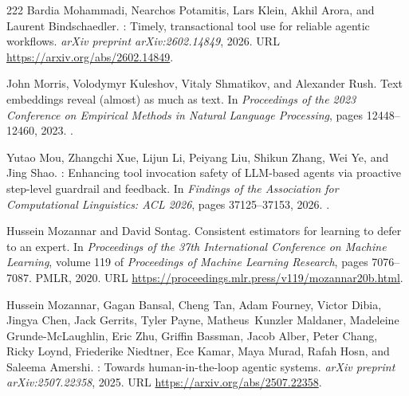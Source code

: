 \begin{thebibliography}{222}
Bardia Mohammadi, Nearchos Potamitis, Lars Klein, Akhil Arora, and Laurent
  Bindschaedler.
: Timely, transactional tool use for reliable agentic
  workflows.
\newblock \emph{arXiv preprint arXiv:2602.14849}, 2026.
\newblock URL \url{https://arxiv.org/abs/2602.14849}.

John Morris, Volodymyr Kuleshov, Vitaly Shmatikov, and Alexander Rush.
\newblock Text embeddings reveal (almost) as much as text.
\newblock In \emph{Proceedings of the 2023 Conference on Empirical Methods in
  Natural Language Processing}, pages 12448--12460, 2023.
\newblock {}.

Yutao Mou, Zhangchi Xue, Lijun Li, Peiyang Liu, Shikun Zhang, Wei Ye, and Jing
  Shao.
: Enhancing tool invocation safety of {LLM}-based agents
  via proactive step-level guardrail and feedback.
\newblock In \emph{Findings of the Association for Computational Linguistics:
  ACL 2026}, pages 37125--37153, 2026.
\newblock {}.

Hussein Mozannar and David Sontag.
\newblock Consistent estimators for learning to defer to an expert.
\newblock In \emph{Proceedings of the 37th International Conference on Machine
  Learning}, volume 119 of \emph{Proceedings of Machine Learning Research},
  pages 7076--7087. PMLR, 2020.
\newblock URL \url{https://proceedings.mlr.press/v119/mozannar20b.html}.

Hussein Mozannar, Gagan Bansal, Cheng Tan, Adam Fourney, Victor Dibia, Jingya
  Chen, Jack Gerrits, Tyler Payne, Matheus~Kunzler Maldaner, Madeleine
  Grunde-McLaughlin, Eric Zhu, Griffin Bassman, Jacob Alber, Peter Chang, Ricky
  Loynd, Friederike Niedtner, Ece Kamar, Maya Murad, Rafah Hosn, and Saleema
  Amershi.
: Towards human-in-the-loop agentic systems.
\newblock \emph{arXiv preprint arXiv:2507.22358}, 2025.
\newblock URL \url{https://arxiv.org/abs/2507.22358}.


\end{thebibliography}
